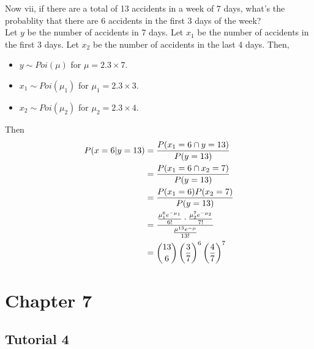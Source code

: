\documentclass[english, 11pt]{article}
\begin{document}
\begin{exmp}
    Now vii, if there are a total of 13 accidents in a week of 7 days, what's the probablity that there are 6 accidents in the first 3 days of the week? \\

    Let $y$ be the number of accidents in 7 days. Let $x_1$ be the number of accidents in the first 3 days. Let $x_2$ be the number of accidents in the last 4 days. Then, \begin{itemize}
      \item $y \sim Poi(\mu)$ for $\mu = 2.3 \times 7$.
      \item $x_1 \sim Poi(\mu_1)$ for $\mu_1 = 2.3 \times 3$.
      \item $x_2 \sim Poi(\mu_2)$ for $\mu_2 = 2.3 \times 4$.
    \end{itemize}
    Then
    \begin{align*}
      P(x = 6 | y = 13) & = \frac{P(x_1 = 6 \cap y =  13)}{P(y = 13)} \\
      & = \frac{P(x_1 = 6 \cap x_2 = 7)}{P(y = 13)} \\
      & = \frac{P(x_1 = 6)P(x_2 = 7)}{P(y = 13)} \\
      & = \frac{\frac{\mu_1^6e^{-\mu_1}}{6!}\cdot \frac{\mu_2^7e^{-\mu_2}}{7!}}{\frac{\mu^{13}e^{-\mu}}{13!}} \\
      & = {13 \choose 6}\left( \frac{3}{7} \right)^6 \left( \frac{4}{7} \right)^7
    \end{align*}
  \end{exmp}
  \newpage
  \section{Chapter 7}

  \subsection{Tutorial 4}
\end{document}
